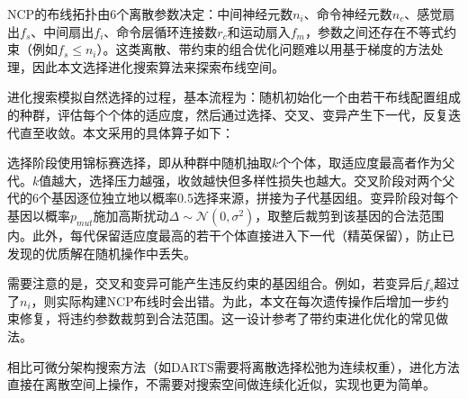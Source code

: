 \xiaosi

NCP的布线拓扑由6个离散参数决定：中间神经元数$n_i$、命令神经元数$n_c$、感觉扇出$f_s$、中间扇出$f_i$、命令层循环连接数$r_c$和运动扇入$f_m$，参数之间还存在不等式约束（例如$f_s \leq n_i$）。这类离散、带约束的组合优化问题难以用基于梯度的方法处理，因此本文选择进化搜索算法\cite{stanley2002neat}来探索布线空间。

进化搜索模拟自然选择的过程，基本流程为：随机初始化一个由若干布线配置组成的种群，评估每个个体的适应度，然后通过选择、交叉、变异产生下一代，反复迭代直至收敛。本文采用的具体算子如下：

选择阶段使用锦标赛选择，即从种群中随机抽取$k$个个体，取适应度最高者作为父代。$k$值越大，选择压力越强，收敛越快但多样性损失也越大。交叉阶段对两个父代的6个基因逐位独立地以概率0.5选择来源，拼接为子代基因组。变异阶段对每个基因以概率$p_{mut}$施加高斯扰动$\Delta \sim \mathcal{N}(0, \sigma^2)$，取整后裁剪到该基因的合法范围内。此外，每代保留适应度最高的若干个体直接进入下一代（精英保留），防止已发现的优质解在随机操作中丢失。

需要注意的是，交叉和变异可能产生违反约束的基因组合。例如，若变异后$f_s$超过了$n_i$，则实际构建NCP布线时会出错。为此，本文在每次遗传操作后增加一步约束修复，将违约参数裁剪到合法范围。这一设计参考了带约束进化优化的常见做法。

相比可微分架构搜索方法（如DARTS\cite{liu2019darts}需要将离散选择松弛为连续权重），进化方法直接在离散空间上操作，不需要对搜索空间做连续化近似，实现也更为简单。
